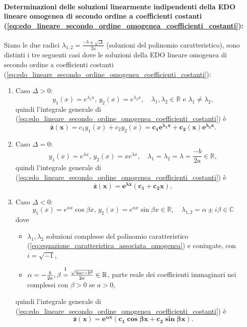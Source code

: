 \paragraph{Determinazioni delle soluzioni linearmente indipendenti della EDO lineare omogenea di secondo ordine a coefficienti costanti (\ref{eq:edo_lineare_secondo_ordine_omogenea_coefficienti_costanti}):} Siano le due radici $\lambda_{1,2}=\frac{-b\pm\sqrt{\Delta}}{2a}$ (soluzioni del polinomio caratteristico), sono distinti i tre seguenti casi dove le soluzioni della EDO lineare omogenea di secondo ordine a coefficienti costanti (\ref{eq:edo_lineare_secondo_ordine_omogenea_coefficienti_costanti}):
\begin{enumerate}
	\item Caso $\Delta>0$:
	\begin{equation}\label{eq:soluzioni_omogenea_secondo_grado_delta_negativa}
		y_1(x) = e^{\lambda_1 x},\, y_2(x) = e^{\lambda_2 x},\quad \lambda_1,\lambda_2\in\mathbb{R}\text{ e } \lambda_1\neq\lambda_2,
	\end{equation}
	quindi l'integrale generale di (\ref{eq:edo_lineare_secondo_ordine_omogenea_coefficienti_costanti}) è
	\begin{equation*}
		\boldsymbol{\bar z(x)} = c_1 y_1(x)+ c_2y_2(x) = \boldsymbol{c_1 e^{\lambda_1 x} + c_2(x) e^{\lambda_2 x}}.
	\end{equation*}
	\item Caso $\Delta = 0$:
	\begin{equation}\label{eq:soluzioni_omogenea_secondo_grado_delta_zero}
		y_1(x) = e^{\lambda x},\, y_2(x)=x e^{\lambda x},\quad \lambda_1=\lambda_2=\lambda=\frac{-b}{2a}\in\mathbb{R},
	\end{equation}
	quindi l'integrale generale di (\ref{eq:edo_lineare_secondo_ordine_omogenea_coefficienti_costanti}) è
	\begin{equation*}
		\boldsymbol{\bar z(x) = e^{\lambda x}(c_1+c_2 x)}, 
	\end{equation*}
	\item Caso $\Delta<0$:
	\begin{equation}\label{eq:soluzioni_omogenea_secondo_grado_delta_positiva}
		y_1(x) = e^{\alpha x}\cos\beta x,\, y_2(x) = e^{\alpha x} \sin\beta x\in\mathbb{R},\quad \lambda_{1,2}=\alpha \pm i \beta\in\mathbb{C}
	\end{equation}
	dove
	\begin{itemize}
		\item $\lambda_1,\lambda_2$ soluzioni complesse del polinomio caratteristico (\ref{eq:equazione_caratteristica_associata_omogenea}) e coniugate, con $i=\sqrt{-1}$,
		\item $\alpha = -\frac{b}{2a}, \beta\overset{\footnotemark}{=}\frac{\sqrt{4ac-b^2}}{2a}\in\mathbb{R}$, parte reale dei coefficienti immaginari nei complessi con $\beta>0$ se $a>0$,
	\end{itemize}
	quindi l'integrale generale di (\ref{eq:edo_lineare_secondo_ordine_omogenea_coefficienti_costanti}) è
	\begin{equation*}
		\boldsymbol{\bar z(x) = e^{\alpha x}(c_1\cos\beta x + c_2\sin\beta x)}.
	\end{equation*}
\end{enumerate}
